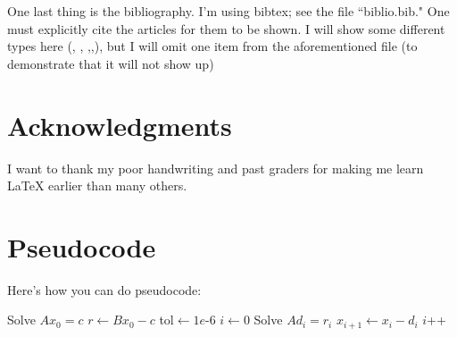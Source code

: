 \documentclass{amsart}
\numberwithin{equation}{section}
\numberwithin{figure}{section}
\begin{document}
One last thing is the bibliography. I'm using bibtex; see the file ``biblio.bib." One must explicitly cite the articles for them to be shown. I will show some different types here (\cite{Lebeau}, \cite{Mor1,Mor2,Mor3}, \cite{MorWun},\cite{Perry},\cite{Tat1}), but I will omit one item from the aforementioned file (to demonstrate that it will not show up)

\section*{Acknowledgments}
I want to thank my poor handwriting and past graders for making me learn LaTeX earlier than many others.

\appendix

\section{Pseudocode}
Here's how you can do pseudocode:

\vspace*{.2in}

\begin{center}
\begin{algorithmic}
\State Solve $Ax_0= c$
\State $r\gets Bx_0-c$
\State tol$\gets 1e$-6
\State $i\gets 0$
\State Solve $Ad_i=r_i$
\State $x_{i+1}\gets x_i-d_i$
\State $i$++
\EndWhile
\end{algorithmic}
\end{center}



\end{document}
